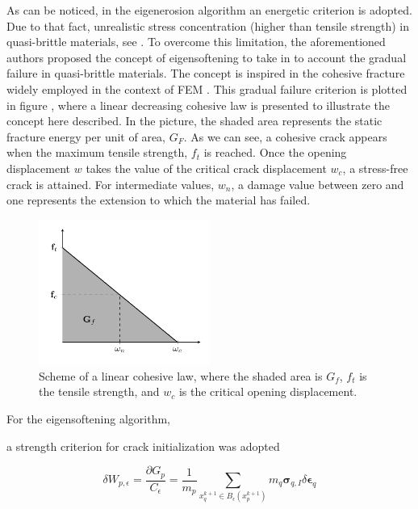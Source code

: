 \documentclass[preprint,12pt,a4paper]{elsarticle}
\newcommand{\tens}[1]{
  \ensuremath{\mathbf{{#1}}}
}
\begin{document}
As can be noticed, in the eigenerosion algorithm an energetic
criterion is adopted. Due to that fact, unrealistic stress
concentration (higher than tensile strength) in quasi-brittle materials, see
\cite{Navas_2017_ES}. To overcome this limitation, the aforementioned
authors proposed the concept of eigensoftening to take in to account
the gradual failure in quasi-brittle materials. The concept is
inspired in the cohesive fracture widely employed in the context of
FEM \cite{Ortiz_1999}. This gradual failure criterion is plotted in
figure \label{fig:Damage-ft-wc}, where a linear decreasing cohesive
law is presented to illustrate the concept here described. In the
picture, the shaded area represents the static fracture energy per
unit of area, $G_F$. As we can see, a cohesive crack appears when the
maximum tensile strength, $f_t$ is reached. Once the opening
displacement $w$ takes the value of the critical crack displacement
$w_c$, a stress-free crack is attained. For intermediate values,
$w_n$, a damage value between zero and one represents the extension to
which the material has failed.
\begin{figure}
  \centering
  \includegraphics[width=0.5\textwidth]{Figures/Damage}
  \caption{Scheme of a linear cohesive law, where the shaded area is
    $G_f$, $f_t$ is the tensile strength, and $w_c$ is the critical
    opening displacement.}
  \label{fig:Damage-ft-wc}
\end{figure}
For the eigensoftening algorithm,

a strength criterion for crack initialization was adopted

\begin{equation}
  \label{eq:variation-averaged-strain-energy-density}
  \delta W_{p,\epsilon} = \frac{\partial G_p}{C_{\epsilon}} =
  \frac{1}{m_p} \sum_{x_q^{k+1} \in
  B_{\epsilon}(x_p^{k+1})} m_q \tens{\sigma}_{q,I} \delta \tens{\epsilon}_q
\end{equation}
\end{document}
